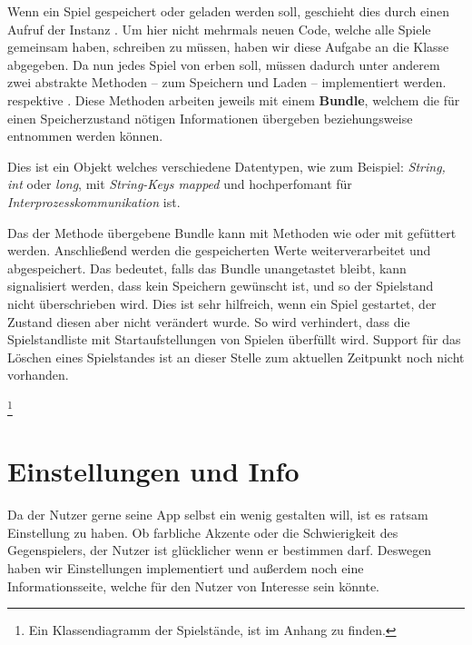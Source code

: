Wenn ein Spiel gespeichert oder geladen werden soll, geschieht dies durch einen
Aufruf der Instanz . Um hier nicht mehrmals neuen Code,
welche alle Spiele gemeinsam haben, schreiben zu müssen, haben wir diese
Aufgabe an die Klasse  abgegeben. Da nun jedes Spiel von
 erben soll, müssen dadurch unter anderem zwei abstrakte
Methoden -- zum Speichern und Laden -- implementiert werden.
 respektive . Diese Methoden
arbeiten jeweils mit einem \textbf{Bundle}, welchem die für einen
Speicherzustand nötigen Informationen übergeben beziehungsweise entnommen
werden können.

\begin{infobox}[frametitle=Bundle]
Dies ist ein Objekt welches verschiedene Datentypen, wie zum Beispiel:
\emph{String, int} oder \emph{long}, mit \emph{String-Keys mapped} und hochperfomant
für \emph{Interprozesskommunikation} ist.
\end{infobox}

Das der Methode  übergebene Bundle kann mit Methoden wie
 oder  mit gefüttert werden.
Anschließend werden die gespeicherten Werte weiterverarbeitet und
abgespeichert. Das bedeutet, falls das Bundle unangetastet bleibt, kann
signalisiert werden, dass kein Speichern gewünscht ist, und so der Spielstand
nicht überschrieben wird. Dies ist sehr hilfreich, wenn ein Spiel gestartet,
der Zustand diesen aber nicht verändert wurde. So wird verhindert, dass die
Spielstandliste mit Startaufstellungen von Spielen überfüllt wird. Support für
das Löschen eines Spielstandes ist an dieser Stelle zum aktuellen Zeitpunkt
noch nicht vorhanden.

\let\thefootnote\relax\footnote{Ein Klassendiagramm der Spielstände, ist im Anhang zu finden.}

\section{Einstellungen und Info}
\sectionauthor{\leonard}

Da der Nutzer gerne seine App selbst ein wenig gestalten will, ist es ratsam
Einstellung zu haben. Ob farbliche Akzente oder die Schwierigkeit des
Gegenspielers, der Nutzer ist glücklicher wenn er bestimmen darf. Deswegen
haben wir Einstellungen implementiert und außerdem noch eine Informationsseite,
welche für den Nutzer von Interesse sein könnte. 

